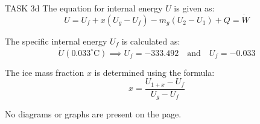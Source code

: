 TASK 3d  
The equation for internal energy \( U \) is given as:  
\[
U = U_f + x \left( U_g - U_f \right) - m_g \left( U_2 - U_1 \right) + Q = \dot{W}
\]  

The specific internal energy \( U_f \) is calculated as:  
\[
\dot{U}(0.033^\circ \text{C}) \implies U_f = -333.492 \quad \text{and} \quad U_f = -0.033
\]  

The ice mass fraction \( x \) is determined using the formula:  
\[
x = \frac{U_{1+x} - U_f}{U_g - U_f}
\]  

No diagrams or graphs are present on the page.